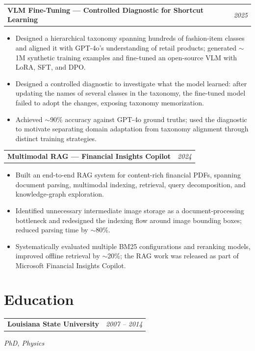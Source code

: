 \documentclass[10pt,letterpaper]{article}
\makeatletter
\newcommand{\experienceHeading}[2]{%
    \vspace{2pt}
    \begin{tabularx}{\textwidth}{@{}Xr@{}}
        \textbf{#1} & \textit{#2}
    \end{tabularx}
}
\newcommand{\researchHeading}[2]{%
\vspace{5pt}
\begin{tabularx}{\textwidth}{@{}Xr@{}}
\textbf{#1} & \textit{#2}
\end{tabularx}
\vspace{-10pt}}
\makeatother
\begin{document}
\researchHeading{VLM Fine-Tuning --- Controlled Diagnostic for Shortcut Learning}{2025}
\vspace{-5pt}
\begin{itemize}
\item Designed a hierarchical taxonomy spanning hundreds of fashion-item classes and aligned it with GPT-4o's understanding of retail products; generated $\sim$1M synthetic training examples and fine-tuned an open-source VLM with LoRA, SFT, and DPO.
\item Designed a controlled diagnostic to investigate what the model learned: after updating the names of several classes in the taxonomy, the fine-tuned model failed to adopt the changes, exposing taxonomy memorization.
\item Achieved $\sim$90\% accuracy against GPT-4o ground truths; used the diagnostic to motivate separating domain adaptation from taxonomy alignment through distinct training strategies.
\end{itemize}

\researchHeading{Multimodal RAG --- Financial Insights Copilot}{2024}
\vspace{-5pt}
\begin{itemize}
\item Built an end-to-end RAG system for content-rich financial PDFs, spanning document parsing, multimodal indexing, retrieval, query decomposition, and knowledge-graph exploration.
\item Identified unnecessary intermediate image storage as a document-processing bottleneck and redesigned the indexing flow around image bounding boxes; reduced parsing time by $\sim$80\%.
\item Systematically evaluated multiple BM25 configurations and reranking models, improved offline retrieval by $\sim$20\%; the RAG work was released as part of Microsoft Financial Insights Copilot.
\end{itemize}

\section*{Education}
\experienceHeading{Louisiana State University}{2007 -- 2014}
\textit{PhD, Physics}
\end{document}
